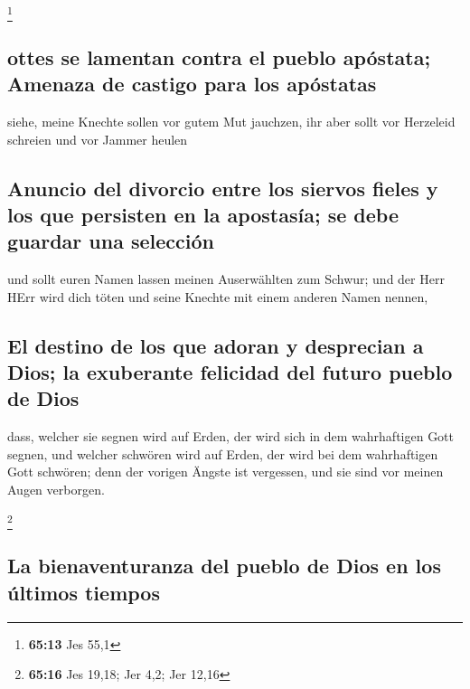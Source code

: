 \footnote{\textbf{65:13} Jes 55,1}

\hypertarget{ottes-se-lamentan-contra-el-pueblo-apuxf3stata-amenaza-de-castigo-para-los-apuxf3statas}{%
\subsection{ottes se lamentan contra el pueblo apóstata; Amenaza de
castigo para los
apóstatas}\label{ottes-se-lamentan-contra-el-pueblo-apuxf3stata-amenaza-de-castigo-para-los-apuxf3statas}}

 siehe, meine Knechte sollen vor gutem Mut jauchzen, ihr
aber sollt vor Herzeleid schreien und vor Jammer heulen

\hypertarget{anuncio-del-divorcio-entre-los-siervos-fieles-y-los-que-persisten-en-la-apostasuxeda-se-debe-guardar-una-selecciuxf3n}{%
\subsection{Anuncio del divorcio entre los siervos fieles y los que
persisten en la apostasía; se debe guardar una
selección}\label{anuncio-del-divorcio-entre-los-siervos-fieles-y-los-que-persisten-en-la-apostasuxeda-se-debe-guardar-una-selecciuxf3n}}

 und sollt euren Namen lassen meinen Auserwählten zum
Schwur; und der Herr HErr wird dich töten und seine Knechte mit einem
anderen Namen nennen,

\hypertarget{el-destino-de-los-que-adoran-y-desprecian-a-dios-la-exuberante-felicidad-del-futuro-pueblo-de-dios}{%
\subsection{El destino de los que adoran y desprecian a Dios; la
exuberante felicidad del futuro pueblo de
Dios}\label{el-destino-de-los-que-adoran-y-desprecian-a-dios-la-exuberante-felicidad-del-futuro-pueblo-de-dios}}

 dass, welcher sie segnen wird auf Erden, der wird sich
in dem wahrhaftigen Gott segnen, und welcher schwören wird auf Erden,
der wird bei dem wahrhaftigen Gott schwören; denn der vorigen Ängste ist
vergessen, und sie sind vor meinen Augen verborgen.

\footnote{\textbf{65:16} Jes 19,18; Jer 4,2; Jer 12,16}

\hypertarget{la-bienaventuranza-del-pueblo-de-dios-en-los-uxfaltimos-tiempos}{%
\subsection{La bienaventuranza del pueblo de Dios en los últimos
tiempos}\label{la-bienaventuranza-del-pueblo-de-dios-en-los-uxfaltimos-tiempos}}

